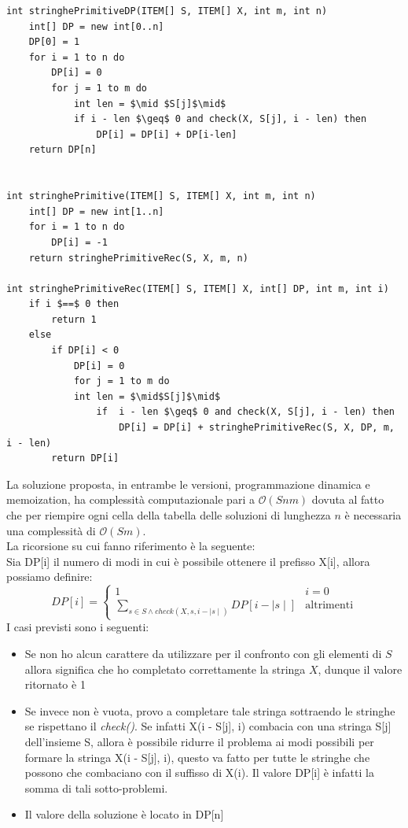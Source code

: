 \documentclass[../cheatSheetAlgoritmi.tex]{subfiles}
\begin{document}
\begin{lstlisting}[caption=Stringhe primitive]
int stringhePrimitiveDP(ITEM[] S, ITEM[] X, int m, int n)
	int[] DP = new int[0..n]
	DP[0] = 1
	for i = 1 to n do
		DP[i] = 0
		for j = 1 to m do
			int len = $\mid $S[j]$\mid$
			if i - len $\geq$ 0 and check(X, S[j], i - len) then
				DP[i] = DP[i] + DP[i-len]
	return DP[n]


int stringhePrimitive(ITEM[] S, ITEM[] X, int m, int n)
	int[] DP = new int[1..n]
	for i = 1 to n do
		DP[i] = -1
	return stringhePrimitiveRec(S, X, m, n)

int stringhePrimitiveRec(ITEM[] S, ITEM[] X, int[] DP, int m, int i)
	if i $==$ 0 then
		return 1
	else
		if DP[i] < 0 
			DP[i] = 0
			for j = 1 to m do
			int len = $\mid$S[j]$\mid$
				if  i - len $\geq$ 0 and check(X, S[j], i - len) then
					DP[i] = DP[i] + stringhePrimitiveRec(S, X, DP, m, i - len)
		return DP[i]		
\end{lstlisting}
La soluzione proposta, in entrambe le versioni, programmazione dinamica e memoization, ha complessità computazionale pari a $\mathcal{O}(Snm)$ dovuta al fatto che per riempire ogni cella della tabella delle soluzioni di lunghezza $n$ è necessaria una complessità di $\mathcal{O}(Sm)$. \\
La ricorsione su cui fanno riferimento è la seguente: \\
Sia DP[i] il numero di modi in cui è possibile ottenere il prefisso X[i], allora possiamo definire: 
\begin{equation*}
  	DP[i] =\begin{cases}
        1 & \text{$i = 0$} \\ 
        \sum_{s \in S \land check(X, s, i - \mid s\mid)} DP[i - \mid s \mid] & \text{altrimenti}
  	\end{cases}
\end{equation*}
I casi previsti sono i seguenti:
\begin{itemize}
	\item Se non ho alcun carattere da utilizzare per il confronto con gli elementi di $S$ allora significa che ho completato correttamente la stringa $X$, dunque il valore ritornato è 1
	\item Se invece non è vuota, provo a completare tale stringa sottraendo le stringhe se rispettano il \emph{check()}. Se infatti X(i - S[j], i) combacia con una stringa S[j] dell'insieme S, allora è possibile ridurre il problema ai modi possibili per formare la stringa X(i - S[j], i), questo va fatto per tutte le stringhe che possono che combaciano con il suffisso di X(i). Il valore DP[i] è infatti la somma di tali sotto-problemi. 
	\item Il valore della soluzione è locato in DP[n]
\end{itemize}
\end{document}
